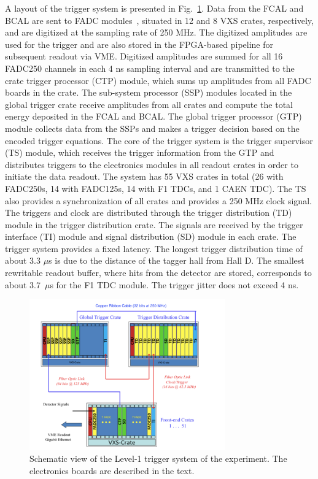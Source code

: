 A layout of the trigger system is presented in Fig.~\ref{fig:trig}. Data from the FCAL and BCAL are sent to  FADC modules~\cite{Dong:2007}, situated in 12 and 8 VXS crates, respectively, and are digitized at the sampling rate of 250 MHz. The digitized amplitudes are used for the trigger and are also stored in the FPGA-based pipeline for subsequent readout via VME.
Digitized amplitudes are summed for all 16 FADC250 channels in each 4 ns sampling interval and are transmitted to the crate trigger processor (CTP) module, which sums up amplitudes from all FADC boards in the crate. The sub-system processor (SSP) modules located in the global trigger crate receive amplitudes from all crates and compute the total energy deposited in the FCAL and BCAL. The global trigger processor (GTP) module collects data from the SSPs and makes a trigger decision based on the encoded trigger equations. The core of the trigger system is the trigger supervisor (TS) module, which receives the trigger information from the GTP and distributes triggers to the electronics modules in all readout 
crates in order to initiate the data readout. The \gx{} system has 55 VXS crates in total (26 with FADC250s, 14 with  FADC125s, 14 with F1 TDCs, and 1 CAEN TDC). The TS also provides a synchronization of all crates and provides a 250 MHz clock signal. The triggers and clock are distributed through the trigger distribution (TD) module in the trigger distribution crate. The signals are received by the trigger interface (TI) module and signal distribution (SD) module in each crate. The \gx{} trigger system provides a fixed latency. The longest trigger distribution time of about 3.3 $\mu$s is due to the distance of the tagger hall from Hall D.
The smallest rewritable readout buffer, where hits from the detector are stored, corresponds to about 3.7~$\mu$s for the F1 TDC module. The trigger jitter does not exceed 4 ns.


\begin{figure}[tbp]
\begin{center}
\includegraphics[width=0.75\textwidth]{figures/125_Somov-f1.pdf}  
\caption{Schematic view of the Level-1 trigger system of the \gx{} experiment. The electronics boards are described in the text.} \label{fig:trig}
\end{center}
\end{figure}

